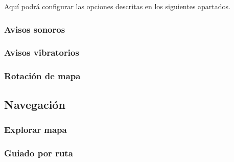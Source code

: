 Aquí podrá configurar las opciones descritas en los siguientes apartados.

\subsubsection{Avisos sonoros}
\subsubsection{Avisos vibratorios}
\subsubsection{Rotación de mapa}
\subsection{Navegación}
\subsubsection{Explorar mapa}
\subsubsection{Guiado por ruta}


